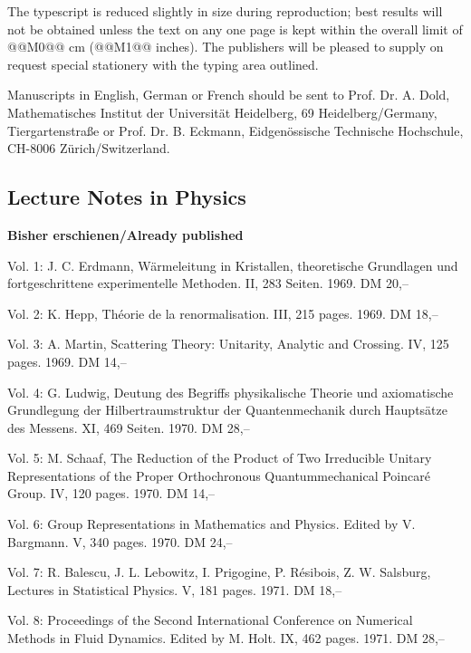 The typescript is reduced slightly in size during reproduction; best results
will not be obtained unless the text on any one page is kept within the overall
limit of @@M0@@ cm (@@M1@@ inches). The publishers will be
pleased to supply on request special stationery with the typing area outlined.

Manuscripts in English, German or French should be sent to Prof. Dr. A. Dold,
Mathematisches Institut der Universität Heidelberg, 69 Heidelberg/Germany,
Tiergartenstraße or Prof. Dr. B. Eckmann, Eidgenössische Technische Hochschule,
CH-8006 Zürich/Switzerland.

\subsection*{Lecture Notes in Physics}
\textbf{Bisher erschienen/Already published}

Vol. 1: J. C. Erdmann, Wärmeleitung in Kristallen, theoretische Grundlagen und
fortgeschrittene experimentelle Methoden. II, 283 Seiten. 1969. DM 20,--

Vol. 2: K. Hepp, Théorie de la renormalisation. III, 215 pages. 1969. DM 18,--

Vol. 3: A. Martin, Scattering Theory: Unitarity, Analytic and Crossing.
IV, 125 pages. 1969. DM 14,--

Vol. 4: G. Ludwig, Deutung des Begriffs physikalische Theorie und axiomatische
Grundlegung der Hilbertraumstruktur der Quantenmechanik durch Hauptsätze des
Messens. XI, 469 Seiten. 1970. DM 28,--

Vol. 5: M. Schaaf, The Reduction of the Product of Two Irreducible Unitary
Representations of the Proper Orthochronous Quantummechanical Poincaré Group.
IV, 120 pages. 1970. DM 14,--

Vol. 6: Group Representations in Mathematics and Physics. Edited by V. Bargmann.
V, 340 pages. 1970. DM 24,--

Vol. 7: R. Balescu, J. L. Lebowitz, I. Prigogine, P. Résibois, Z. W. Salsburg,
Lectures in Statistical Physics. V, 181 pages. 1971. DM 18,--

Vol. 8: Proceedings of the Second International Conference on Numerical Methods
in Fluid Dynamics. Edited by M. Holt. IX, 462 pages. 1971. DM 28,--

